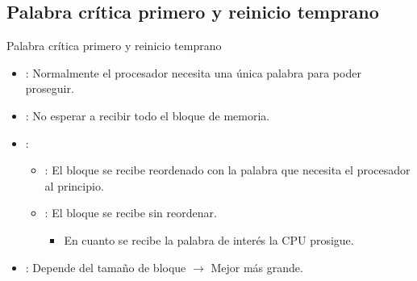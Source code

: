 \subsection{Palabra crítica primero y reinicio temprano}

\begin{frame}[t]{Palabra crítica primero y reinicio temprano}
\begin{itemize}
  \item {}: 
        Normalmente el procesador necesita una única palabra para poder proseguir.

  \item {}: 
        No esperar a recibir todo el bloque de memoria.

  \item {}:
    \begin{itemize}
      \item {}: 
            El bloque se recibe reordenado con la palabra que 
            necesita el procesador al principio.

      \item {}: 
            El bloque se recibe sin reordenar.
        \begin{itemize}
          \item En cuanto se recibe la palabra de interés la CPU prosigue.
        \end{itemize}
    \end{itemize}

  \item {}:
        Depende del tamaño de bloque $\rightarrow$ Mejor más grande.


\end{itemize}
\end{frame}
